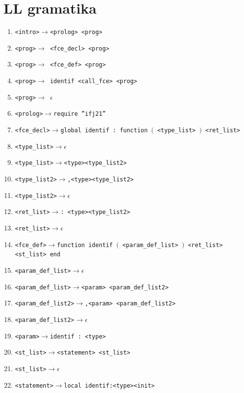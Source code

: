 \documentclass[11pt]{article}
\newcommand{\term}[1]{{\color{red}#1}}
\newcommand{\arrow}{$\rightarrow$}
\begin{document}
\section{LL gramatika}
\begin{enumerate}
    {\color{red}}
    \item \texttt{<intro>\arrow{}<prolog> <prog> }  
    \item \texttt{<prog>\arrow{} <fce\_decl> <prog>}
    \item \texttt{<prog>\arrow{} <fce\_def> <prog>}
    \item \texttt{<prog>\arrow{} \term{identif} <call\_fce> <prog>}
    \item \texttt{<prog>\arrow{} $\epsilon$}    
    \item \texttt{<prolog>\arrow{}\term{require} \term{''ifj21''}   }
    \item \texttt{<fce\_decl>\arrow{}\term{global} \term{identif} \term{:} \term{function} \term{$($} <type\_list> \term{$)$} <ret\_list>}
    \item \texttt{<type\_list>\arrow{}$\epsilon$}
    \item \texttt{<type\_list>\arrow{}<type><type\_list2>}
    \item \texttt{<type\_list2>\arrow{}\term{,}<type><type\_list2>} 
    \item \texttt{<type\_list2>\arrow{}$\epsilon$}
    \item \texttt{<ret\_list>\arrow{}\term{:} <type><type\_list2>}
    \item \texttt{<ret\_list>\arrow{}$\epsilon$}
    \item \texttt{<fce\_def>\arrow{}\term{function} \term{identif} \term{$($} <param\_def\_list> \term{$)$} <ret\_list> <st\_list> \term{end}}
    \item \texttt{<param\_def\_list>\arrow{}$\epsilon$}
    \item \texttt{<param\_def\_list>\arrow{}<param> <param\_def\_list2>}
    \item \texttt{<param\_def\_list2>\arrow{}\term{,}<param> <param\_def\_list2>}
    \item \texttt{<param\_def\_list2>\arrow{}$\epsilon$}
    \item \texttt{<param>\arrow{}\term{identif} \term{:} <type>}
    \item \texttt{<st\_list>\arrow{}<statement> <st\_list>}
    \item \texttt{<st\_list>\arrow{}$\epsilon$}
    \item \texttt{<statement>\arrow{}\term{local} \term{identif}\term{:}<type><init>}

\end{enumerate}
\end{document}
